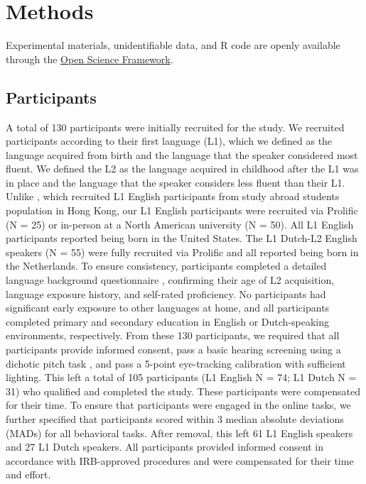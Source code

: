 \section{Methods}
Experimental materials, unidentifiable data, and R code are openly available through the 
\href{https://osf.io/wa4gv/?view_only=de113dbced6b46fab96ca8217b3c1ca6}{Open Science Framework}.


\subsection{Participants}
A total of 130 participants were initially recruited for the study. We recruited participants according to their first language (L1), which we defined as the language acquired from birth and the language that the speaker considered most fluent. We defined the L2 as the language acquired in childhood after the L1 was in place and the language that the speaker considers less fluent than their L1. Unlike \textcite{ge2021a}, which recruited L1 English participants from study abroad students population in Hong Kong, our L1 English participants were recruited via Prolific (N = 25) \parencite{prolific2024} or in-person at a North American university (N = 50). All L1 English participants reported being born in the United States. The L1 Dutch-L2 English speakers (N = 55) were fully recruited via Prolific and all reported being born in the Netherlands. To ensure consistency, participants completed a detailed language background questionnaire \parencite{Marian_Blumenfeld_Kaushanskaya_2007}, confirming their age of L2 acquisition, language exposure history, and self-rated proficiency. No participants had significant early exposure to other languages at home, and all participants completed primary and secondary education in English or Dutch-speaking environments, respectively. From these 130 participants, we required that all participants provide informed consent, pass a basic hearing screening using a dichotic pitch task \parencite{milne_2021}, and pass a 5-point eye-tracking calibration with sufficient lighting. This left a total of 105 participants (L1 English N = 74; L1 Dutch N = 31) who qualified and completed the study. These participants were compensated for their time. To ensure that participants were engaged in the online tasks, we further specified that participants scored within 3 median absolute deviations (MADs) \parencite{Leys_2013} for all behavioral tasks. After removal, this left 61 L1 English speakers and 27 L1 Dutch speakers. All participants provided informed consent in accordance with IRB-approved procedures and were compensated for their time and effort.

